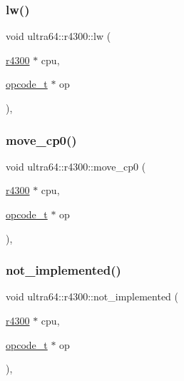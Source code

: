 \subsubsection{\texorpdfstring{lw()}{lw()}}
{\footnotesize\ttfamily void ultra64\+::r4300\+::lw (\begin{DoxyParamCaption}\item[{\hyperlink{classultra64_1_1r4300}{r4300} $\ast$}]{cpu,  }\item[{\hyperlink{classultra64_1_1opcode__t}{opcode\+\_\+t} $\ast$}]{op }\end{DoxyParamCaption})\hspace{0.3cm}{\ttfamily [static]}, {\ttfamily [private]}}

\mbox{\label{classultra64_1_1r4300_a457c88d75755b9ce42535991bff3bc2b}} 
\subsubsection{\texorpdfstring{move\+\_\+cp0()}{move\_cp0()}}
{\footnotesize\ttfamily void ultra64\+::r4300\+::move\+\_\+cp0 (\begin{DoxyParamCaption}\item[{\hyperlink{classultra64_1_1r4300}{r4300} $\ast$}]{cpu,  }\item[{\hyperlink{classultra64_1_1opcode__t}{opcode\+\_\+t} $\ast$}]{op }\end{DoxyParamCaption})\hspace{0.3cm}{\ttfamily [static]}, {\ttfamily [private]}}

\mbox{\label{classultra64_1_1r4300_a76d6699da1398760e461f85be19e134d}} 
\subsubsection{\texorpdfstring{not\+\_\+implemented()}{not\_implemented()}}
{\footnotesize\ttfamily void ultra64\+::r4300\+::not\+\_\+implemented (\begin{DoxyParamCaption}\item[{\hyperlink{classultra64_1_1r4300}{r4300} $\ast$}]{cpu,  }\item[{\hyperlink{classultra64_1_1opcode__t}{opcode\+\_\+t} $\ast$}]{op }\end{DoxyParamCaption})\hspace{0.3cm}{\ttfamily [static]}, {\ttfamily [private]}}

